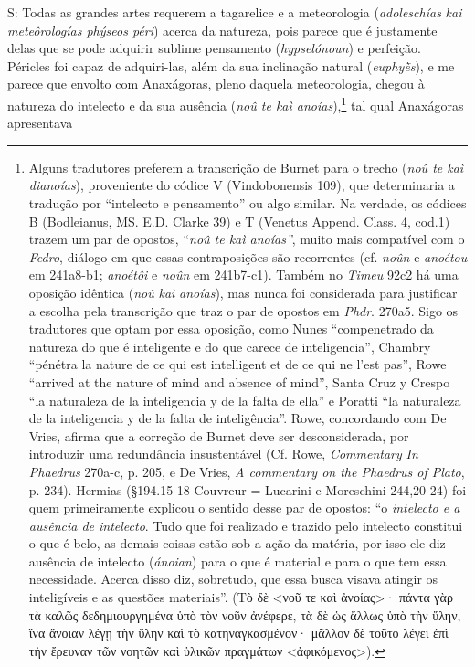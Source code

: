 S: Todas as grandes artes requerem a tagarelice e a meteorologia
(\emph{adoleschías} \emph{kai} \emph{meteôrologías phýseos péri}) acerca
da natureza, pois parece que é justamente delas que se pode adquirir
sublime pensamento (\emph{hypselónoun}) e perfeição. Péricles foi capaz
de adquiri-las, além da sua inclinação natural (\emph{euphyḕs}), e me
parece que envolto com Anaxágoras, pleno daquela meteorologia, chegou à
natureza do intelecto e da sua ausência (\emph{noû te kaì
anoías}),\footnote{Alguns tradutores preferem a transcrição de Burnet
  para o trecho (\emph{noû te kaì dianoías}), proveniente do códice V
  (Vindobonensis 109), que determinaria a tradução por ``intelecto e
  pensamento'' ou algo similar. Na verdade, os códices B (Bodleianus,
  MS. E.D. Clarke 39) e T (Venetus Append. Class. 4, cod.1) trazem um
  par de opostos, ``\emph{noû te kaì anoías''}, muito mais compatível
  com o \emph{Fedro}, diálogo em que essas contraposições são
  recorrentes (cf. \emph{noûn} e \emph{anoétou} em 241a8-b1;
  \emph{anoétôi} e \emph{noûn} em 241b7-c1). Também no \emph{Timeu} 92c2
  há uma oposição idêntica (\emph{noû} \emph{kaì} \emph{anoías}), mas
  nunca foi considerada para justificar a escolha pela transcrição que
  traz o par de opostos em \emph{Phdr}. 270a5. Sigo os tradutores que
  optam por essa oposição, como Nunes ``compenetrado da natureza do que
  é inteligente e do que carece de inteligencia'', Chambry ``pénétra la
  nature de ce qui est intelligent et de ce qui ne l'est pas'', Rowe
  ``arrived at the nature of mind and absence of mind'', Santa Cruz y
  Crespo ``la naturaleza de la inteligencia y de la falta de ella'' e
  Poratti ``la naturaleza de la inteligencia y de la falta de
  inteligência''. Rowe, concordando com De Vries, afirma que a correção
  de Burnet deve ser desconsiderada, por introduzir uma redundância
  insustentável (Cf. Rowe, \emph{Commentary} \emph{In Phaedrus} 270a-c,
  p. 205, e De Vries, \emph{A commentary on the Phaedrus of Plato}, p.
  234). Hermias (§194.15-18 Couvreur = Lucarini e Moreschini 244,20-24)
  foi quem primeiramente explicou o sentido desse par de opostos: ``o
  \emph{intelecto e a ausência de intelecto}. Tudo que foi realizado e
  trazido pelo intelecto constitui o que é belo, as demais coisas estão
  sob a ação da matéria, por isso ele diz ausência de intelecto
  (\emph{ánoian}) para o que é material e para o que tem essa
  necessidade. Acerca disso diz, sobretudo, que essa busca visava
  atingir os inteligíveis e as questões materiais''. (Τὸ δὲ
  \textless{}νοῦ τε καὶ ἀνοίας\textgreater{}· πάντα γὰρ τὰ καλῶς
  δεδημιουργημένα ὑπὸ τὸν νοῦν ἀνέφερε, τὰ δὲ ὡς ἄλλως ὑπὸ τὴν ὕλην, ἵνα
  ἄνοιαν λέγῃ τὴν ὕλην καὶ τὸ κατηναγκασμένον· μᾶλλον δὲ τοῦτο λέγει ἐπὶ
  τὴν ἔρευναν τῶν νοητῶν καὶ ὑλικῶν πραγμάτων
  \textless{}ἀφικόμενος\textgreater{}).} tal qual Anaxágoras apresentava
